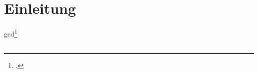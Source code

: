 \section{Einleitung}

\lipsum[1]\newline

\gls{gcd}\footcite{art:hollings2017early}

\subsection{}
\subsection{}
\subsection{}
\subsection{}
